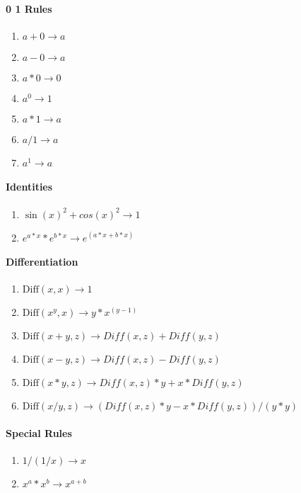 \documentclass{article}
\begin{document}
\paragraph{0 1 Rules}
\begin{enumerate}
\item $a+0 \rightarrow a$
\item $a-0 \rightarrow a$
\item $a*0 \rightarrow 0$
\item $a^0 \rightarrow 1$
\item $a*1 \rightarrow a$
\item $a/1 \rightarrow a$
\item $a^1 \rightarrow a$
\end{enumerate}

\paragraph{Identities}
\begin{enumerate}
\item $\sin(x)^2 + cos(x)^2 \rightarrow 1$
\item $e^{a*x}*e^{b*x} \rightarrow e^{(a*x+b*x)}$
\end{enumerate}

\paragraph{Differentiation}
\begin{enumerate}
\item $\text{Diff}(x, x) \rightarrow 1$
\item $\text{Diff}(x^y, x) \rightarrow y*x^(y-1)$
\item $\text{Diff}(x+y, z) \rightarrow Diff(x, z) + Diff(y, z)$
\item $\text{Diff}(x-y, z) \rightarrow Diff(x, z) - Diff(y, z)$
\item $\text{Diff}(x*y, z) \rightarrow Diff(x, z) * y + x * Diff(y, z)$
\item $\text{Diff}(x/y, z) \rightarrow (Diff(x, z) * y - x * Diff(y, z)) / (y * y)$
\end{enumerate}

\paragraph{Special Rules}
\begin{enumerate}
\item $1/(1/x) \rightarrow x$
\item $x^a*x^b \rightarrow x^{a+b}$
\end{enumerate}
\end{document}
